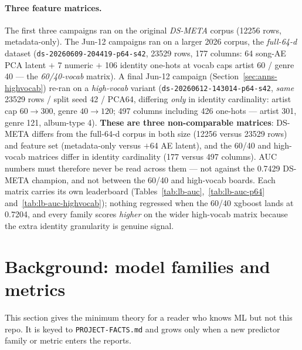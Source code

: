 \documentclass[11pt]{article}
\newcommand{\dsid}[1]{\texttt{\small #1}}
\begin{document}
\paragraph{Three feature matrices.} The first three campaigns ran on the
original \emph{DS-META} corpus (\num{12256} rows, metadata-only). The Jun-12
campaigns ran on a larger 2026 corpus, the \emph{full-64-d} dataset
(\dsid{ds-20260609-204419-p64-s42}, \num{23529} rows, 177 columns: 64 song-AE
PCA latent $+$ 7 numeric $+$ 106 identity one-hots at vocab caps artist 60 /
genre 40 --- the \emph{60/40-vocab} matrix). A final Jun-12 campaign
(Section~\ref{sec:anns-highvocab}) re-ran on a \emph{high-vocab} variant
(\dsid{ds-20260612-143014-p64-s42}, \emph{same} \num{23529} rows / split seed 42
/ PCA64, differing \emph{only} in identity cardinality: artist cap $60\to300$,
genre $40\to120$; 497 columns including 426 one-hots --- artist 301, genre 121,
album-type 4). \textbf{These are three non-comparable matrices}: DS-META differs
from the full-64-d corpus in both size (\num{12256} versus \num{23529} rows) and
feature set (metadata-only versus $+$64 AE latent), and the 60/40 and high-vocab
matrices differ in identity cardinality (177 versus 497 columns). AUC numbers
must therefore never be read across them --- not against the \num{0.7429}
DS-META champion, and not between the 60/40 and high-vocab boards. Each matrix
carries its own leaderboard (Tables~\ref{tab:lb-auc},~\ref{tab:lb-auc-p64}
and~\ref{tab:lb-auc-highvocab}); nothing regressed when the 60/40 xgboost lands
at \num{0.7204}, and every family scores \emph{higher} on the wider high-vocab
matrix because the extra identity granularity is genuine signal.

\section{Background: model families and metrics}
\label{sec:background}
This section gives the minimum theory for a reader who knows ML but not this
repo. It is keyed to \texttt{PROJECT-FACTS.md} and grows only when a new
predictor family or metric enters the reports.
\end{document}
